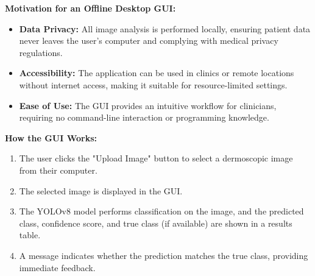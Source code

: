 \documentclass[a4paper,12pt]{report}
\begin{document}
\begin{spacing}{1.5}
    \textbf{Motivation for an Offline Desktop GUI:}
    \begin{itemize}
        \item \textbf{Data Privacy:} All image analysis is performed locally, ensuring patient data never leaves the user's computer and complying with medical privacy regulations.
        \item \textbf{Accessibility:} The application can be used in clinics or remote locations without internet access, making it suitable for resource-limited settings.
        \item \textbf{Ease of Use:} The GUI provides an intuitive workflow for clinicians, requiring no command-line interaction or programming knowledge.
    \end{itemize}
    
    \textbf{How the GUI Works:}
    \begin{enumerate}
        \item The user clicks the "Upload Image" button to select a dermoscopic image from their computer.
        \item The selected image is displayed in the GUI.
        \item The YOLOv8 model performs classification on the image, and the predicted class, confidence score, and true class (if available) are shown in a results table.
        \item A message indicates whether the prediction matches the true class, providing immediate feedback.
    \end{enumerate}
    

\end{spacing}
\end{document}
